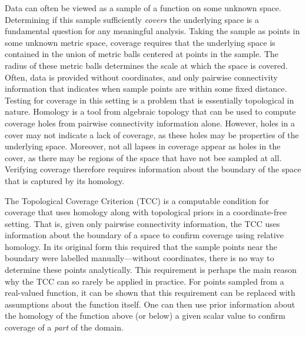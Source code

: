 
Data can often be viewed as a sample of a function on some unknown space.
Determining if this sample sufficiently \emph{covers} the underlying space is a fundamental question for any meaningful analysis.
Taking the sample as points in some unknown metric space, coverage requires that the underlying space is contained in the union of metric balls centered at points in the sample.
The radius of these metric balls determines the scale at which the space is covered.
Often, data is provided without coordinates, and only pairwise connectivity information that indicates when sample points are within some fixed distance.
Testing for coverage in this setting is a problem that is essentially topological in nature.
Homology is a tool from algebraic topology that can be used to compute coverage holes from pairwise connectivity information alone.
However, holes in a cover may not indicate a lack of coverage, as these holes may be properties of the underlying space.
Moreover, not all lapses in coverage appear as holes in the cover, as there may be regions of the space that have not bee sampled at all.
Verifying coverage therefore requires information about the boundary of the space that is captured by its homology.

The Topological Coverage Criterion (TCC) is a computable condition for coverage that uses homology along with topological priors in a coordinate-free setting.
That is, given only pairwise connectivity information, the TCC uses information about the boundary of a space to confirm coverage using relative homology.
In its original form this required that the sample points near the boundary were labelled manually---without coordinates, there is no way to determine these points analytically.
This requirement is perhaps the main reason why the TCC can so rarely be applied in practice.
For points sampled from a real-valued function, it can be shown that this requirement can be replaced with assumptions about the function itself.
One can then use prior information about the homology of the function above (or below) a given scalar value to confirm coverage of a \emph{part} of the domain.


